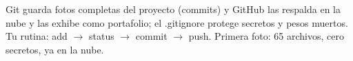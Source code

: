 \documentclass[11pt,a4paper]{article}
\begin{document}
\begin{resumen}
Git guarda fotos completas del proyecto (commits) y GitHub las respalda en la nube y las
exhibe como portafolio; el .gitignore protege secretos y pesos muertos. Tu rutina: add
$\rightarrow$ status $\rightarrow$ commit $\rightarrow$ push. Primera foto: 65 archivos,
cero secretos, ya en la nube.
\end{resumen}
\end{document}
